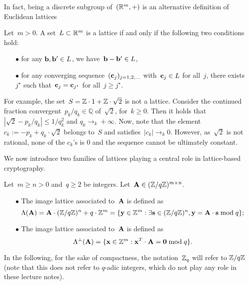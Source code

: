 In fact, being a discrete subgroup of~$(\mathbb{R}^m,+)$ is an alternative definition of Euclidean lattices

\begin{lemma}
\label{def:lattice2}
Let~$m >0$. A set~$L \subset \mathbb{R}^m$ is a lattice if and only if the following two conditions hold:
\begin{itemize}
\item[$\bullet$] for any ${\bf b}, {\bf b}' \in L$, we have~${\bf b} - {\bf b}' \in L$,
\item[$\bullet$] for any converging sequence~$({\bf c}_j)_{j=1,2,\ldots}$ with~${\bf c}_j \in L$ for all~$j$, there exists~$j^\star$ such that~${\bf c}_j = {\bf c}_{j^\star}$ for all~$j \geq j^\star$. 
\end{itemize}
\end{lemma}

For example, the set~$S= \mathbb{Z} \cdot 1 + \mathbb{Z} \cdot \sqrt{2}$ is not a lattice. Consider the continued fraction convergent~$p_k/q_k \in \mathbb{Q}$ of~$\sqrt{2}$, for~$k \geq 0$. Then it holds that~$|\sqrt{2} - p_k /q_k| \leq 1/q_k^2$ and $q_k \rightarrow_k +\infty$. Now, note that the element~$c_k := -p_k + q_k \cdot  \sqrt{2}$ belongs to~$S$ and satisfies~$|c_k| \rightarrow_k 0$. However, as~$\sqrt{2}$ is not rational, none of the $c_k$'s is $0$ and the sequence cannot be ultimately constant.

We now introduce two families of lattices playing a central role in lattice-based cryptography.

\begin{definition}
\label{def:qary}
Let~$m \geq n >0$ and~$q \geq 2$ be integers. Let~${\bf A} \in (\mathbb{Z}/q\mathbb{Z})^{m \times n}$. 
\begin{itemize} 
\item[$\bullet$] The image lattice associated to~${\bf A}$ is defined as
\[
\Lambda({\bf A}) = {\bf A} \cdot (\mathbb{Z}/q\mathbb{Z})^n + q \cdot \mathbb{Z}^m = \{ {\bf y} \in \mathbb{Z}^m: \exists {\bf s} \in (\mathbb{Z}/q\mathbb{Z})^n, {\bf y} = {\bf A}\cdot {\bf s} \bmod q\};
\]
\item[$\bullet$] The image lattice associated to~${\bf A}$ is defined as
\[
\Lambda^\perp({\bf A}) = \{ {\bf x} \in \mathbb{Z}^m: {\bf x}^T \cdot {\bf A} = {\bf 0} \bmod q\}.
\]
\end{itemize}
\end{definition}

In the following, for the sake of compactness, the notation~$\mathbb{Z}_q$ will refer to $\mathbb{Z}/q\mathbb{Z}$ (note that this does not refer 
to $q$-adic integers, which do not play any role in these lecture notes). 


